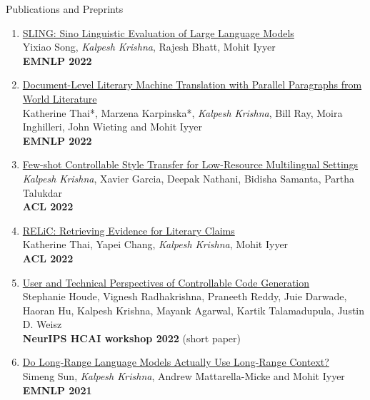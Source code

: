 \documentclass{resume} %
\begin{document}
\begin{rSection}{Publications and Preprints}
\begin{enumerate}[leftmargin=*]
\item \href{https://arxiv.org/abs/2210.11689}{SLING: Sino Linguistic Evaluation of Large Language Models} \\
Yixiao Song, \textit{Kalpesh Krishna}, Rajesh Bhatt, Mohit Iyyer \\
\textbf{EMNLP 2022}

\item \href{https://arxiv.org/abs/2210.14250}{Document-Level Literary Machine Translation with Parallel Paragraphs from World Literature} \\
Katherine Thai*, Marzena Karpinska*, \textit{Kalpesh Krishna}, Bill Ray, Moira Inghilleri, John Wieting and Mohit Iyyer \\
\textbf{EMNLP 2022}


\item \href{https://arxiv.org/abs/2110.07385}{Few-shot Controllable Style Transfer for Low-Resource Multilingual Settings} \\
\textit{Kalpesh Krishna}, Xavier Garcia, Deepak Nathani, Bidisha Samanta, Partha Talukdar \\
\textbf{ACL 2022}

\item \href{https://arxiv.org/abs/2203.10053}{RELiC: Retrieving Evidence for Literary Claims} \\
Katherine Thai, Yapei Chang, \textit{Kalpesh Krishna}, Mohit Iyyer \\
\textbf{ACL 2022}

\item \href{https://research.ibm.com/publications/user-and-technical-perspectives-of-controllable-code-generation}{User and Technical Perspectives of Controllable Code Generation} \\
Stephanie Houde, Vignesh Radhakrishna, Praneeth Reddy, Juie Darwade, Haoran Hu, Kalpesh Krishna, Mayank Agarwal, Kartik Talamadupula, Justin D. Weisz \\
\textbf{NeurIPS HCAI workshop 2022} (short paper)

\item \href{https://arxiv.org/abs/2109.09115}{Do Long-Range Language Models Actually Use Long-Range Context?} \\
Simeng Sun, \textit{Kalpesh Krishna}, Andrew Mattarella-Micke and Mohit Iyyer \\
\textbf{EMNLP 2021}


\end{enumerate}
\end{rSection}
\end{document}
